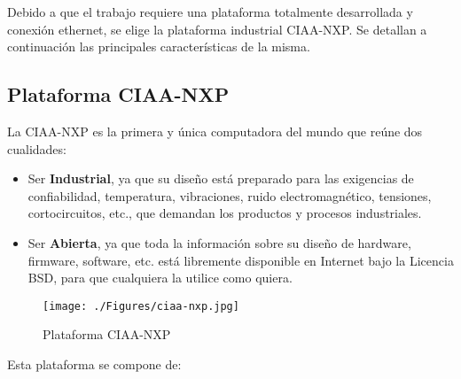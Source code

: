 Debido a que el trabajo requiere una plataforma totalmente desarrollada y conexión ethernet, se elige la plataforma industrial CIAA-NXP. Se detallan a continuación las principales características de la misma.

\subsection{Plataforma CIAA-NXP}

La CIAA-NXP es la primera y única computadora del mundo que reúne dos cualidades:

\begin{itemize}
\item 
Ser \textbf{Industrial}, ya que su diseño está preparado para las exigencias de confiabilidad, temperatura, vibraciones, ruido electromagnético, tensiones, cortocircuitos, etc., que demandan los productos y procesos industriales.
\item 
Ser \textbf{Abierta}, ya que toda la información sobre su diseño de hardware, firmware, software, etc. está libremente disponible en Internet bajo la Licencia BSD, para que cualquiera la utilice como quiera.
\end{itemize}

\begin{figure}[h!]
	\centering
    \texttt{[image: ./Figures/ciaa-nxp.jpg]}
	\label{fig:ciaa-nxp}
	\caption{Plataforma CIAA-NXP}
\end{figure}


\noindent Esta plataforma se compone de:


